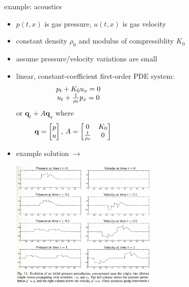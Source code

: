 \documentclass[10pt,hyperref]{beamer}
\newcommand{\bq}{\mathbf{q}}
\begin{document}
\begin{frame}{example: acoustics}

\begin{itemize}
\item $p(t,x)$ is gas pressure, $u(t,x)$ is gas velocity
\item constant density $\rho_0$ and modulus of compressiblity $K_0$
\item assume pressure/velocity variations are small
\item linear, constant-coefficient first-order PDE system:
$$\begin{matrix} p_t + K_0 u_x = 0 \\ u_t + \frac{1}{\rho_0} p_x = 0 \end{matrix} \hspace{60mm}$$
or $\bq_t + A \bq_x$ where
$$\bq = \begin{bmatrix} p \\ u \end{bmatrix}, \, A = \begin{bmatrix} 0 & K_0 \\ \frac{1}{\rho_0} & 0 \end{bmatrix} \hspace{65mm}$$
\item example solution $\longrightarrow$

\vspace{-30mm}
\hfill \includegraphics[width=0.55\textwidth]{figs/leveque3p1}
\end{itemize}
\end{frame}
\end{document}

